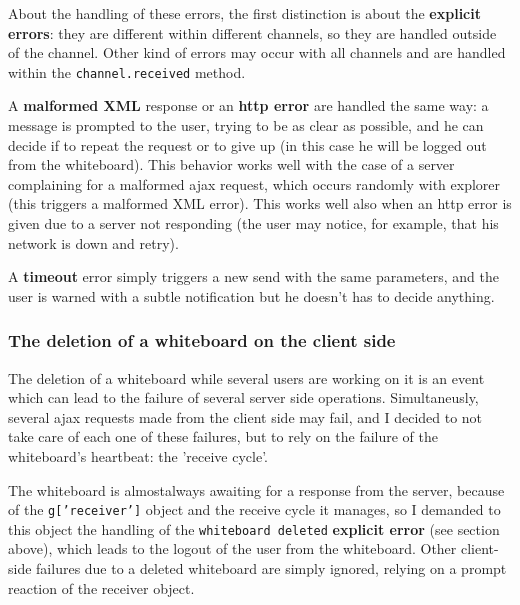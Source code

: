\documentclass[10pt,a4paper,english]{book}
\begin{document}
About the handling of these errors, the first distinction is about the
\textbf{explicit errors}: they are different within different channels, so
they are handled outside of the channel. Other kind of errors may
occur with all channels and are handled within the
\texttt{channel.received} method.

A \textbf{malformed XML} response or an \textbf{http error} are handled the same
way: a message is prompted to the user, trying to be as clear as
possible, and he can decide if to repeat the request or to give up (in
this case he will be logged out from the whiteboard). This behavior
works well with the case of a server complaining for a malformed ajax
request, which occurs randomly with explorer (this triggers a
malformed XML error). This works well also when an http error is given
due to a server not responding (the user may notice, for example, that
his network is down and retry).

A \textbf{timeout} error simply triggers a new send with the same
parameters, and the user is warned with a subtle notification but he
doesn't has to decide anything.



\hypertarget{the-deletion-of-a-whiteboard-on-the-client-side}{}
\subsubsection{The deletion of a whiteboard on the client side}
\label{the-deletion-of-a-whiteboard-on-the-client-side}

The deletion of a whiteboard while several users are working on it is
an event which can lead to the failure of several server side
operations. Simultaneusly, several ajax requests made from the client
side may fail, and I decided to not take care of each one of these
failures, but to rely on the failure of the whiteboard's heartbeat:
the 'receive cycle'.

The whiteboard is almost\footnotemark[6] always awaiting for a response from
the server, because of the \texttt{g{[}'receiver'{]}} object and the receive
cycle it manages, so I demanded to this object the handling of the
\texttt{whiteboard deleted} \textbf{explicit error} (see section above), which
leads to the logout of the user from the whiteboard. Other client-side
failures due to a deleted whiteboard are simply ignored, relying on a
prompt reaction of the receiver object.
\end{document}
